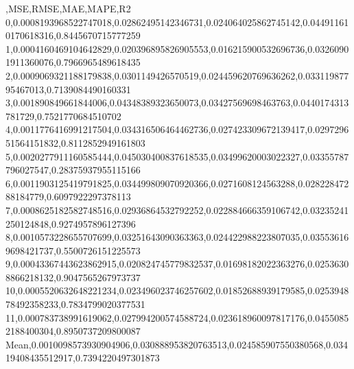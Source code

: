 ,MSE,RMSE,MAE,MAPE,R2
0,0.0008193968522747018,0.02862495142346731,0.024064025862745142,0.044911610170618316,0.8445670715777259
1,0.0004160469104642829,0.020396895826905553,0.016215900532696736,0.03260901911360076,0.7966965489618435
2,0.0009069321188179838,0.0301149426570519,0.024459620769636262,0.03311987795467013,0.7139084490160331
3,0.001890849661844006,0.04348389323650073,0.03427569698463763,0.0440174313781729,0.7521770684510702
4,0.0011776416991217504,0.034316506464462736,0.027423309672139417,0.029729651564151832,0.8112852949161803
5,0.0020277911160585444,0.045030400837618535,0.03499620003022327,0.03355787796027547,0.28375937955115166
6,0.0011903125419791825,0.034499809070920366,0.0271608124563288,0.02822847288184779,0.6097922297378113
7,0.0008625182582748516,0.02936864532792252,0.022884666359106742,0.03235241250124848,0.9274957896127396
8,0.0010573228655707699,0.03251643090363363,0.024422988223807035,0.035536169698421737,0.5500726151225573
9,0.00043367443623862915,0.020824745779832537,0.01698182022363276,0.02536308866218132,0.9047565267973737
10,0.0005520632648221234,0.023496023746257602,0.01852688939179585,0.025394878492358233,0.7834799020377531
11,0.000783738991619062,0.027994200574588724,0.023618960097817176,0.04550852188400304,0.8950737209800087
Mean,0.0010098573930904906,0.030888953820763513,0.024585907550380568,0.03419408435512917,0.7394220497301873
